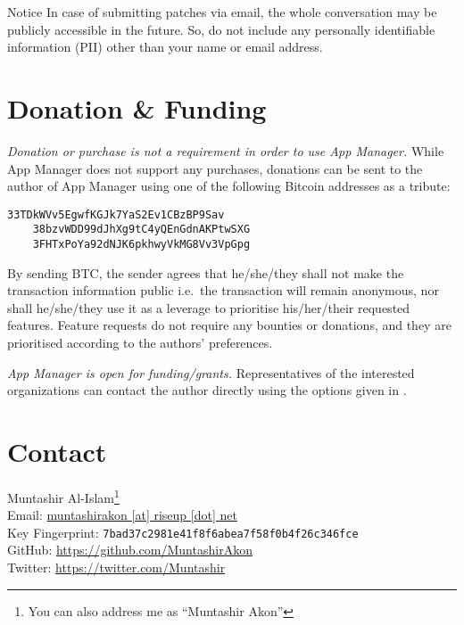 \begin{warning}{Notice}
    In case of submitting patches via email, the whole conversation may be publicly accessible in the future. So, do not
    include any personally identifiable information (PII) other than your name or email address.
\end{warning}

\section{Donation \& Funding}\label{sec:donation-&-funding}
\emph{Donation or purchase is not a requirement in order to use App Manager.} While App Manager does not support any
purchases, donations can be sent to the author of App Manager using one of the following Bitcoin addresses as a tribute:
\begin{Verbatim}[label={verb:btc-donation}]
    33TDkWVv5EgwfKGJk7YaS2Ev1CBzBP9Sav
    38bzvWDD99dJhXg9tC4yQEnGdnAKPtwSXG
    3FHTxPoYa92dNJK6pkhwyVkMG8Vv3VpGpg
\end{Verbatim}

By sending BTC, the sender agrees that he/she/they shall not make the transaction information public i.e.\ the
transaction will remain anonymous, nor shall he/she/they use it as a leverage to prioritise his/her/their requested
features. Feature requests do not require any bounties or donations, and they are prioritised according to the authors'
preferences.

\emph{App Manager is open for funding/grants.} Representatives of the interested organizations can contact the author
directly using the options given in .

\section{Contact}\label{sec:contact}
Muntashir Al-Islam\footnote{You can also address me as ``Muntashir Akon''}\\
Email: \href{mailto:muntashirakon@riseup.net}{muntashirakon [at] riseup [dot] net}\\
Key Fingerprint: \texttt{7bad37c2981e41f8f6abea7f58f0b4f26c346fce}\\
GitHub: \url{https://github.com/MuntashirAkon}\\
Twitter: \url{https://twitter.com/Muntashir}

